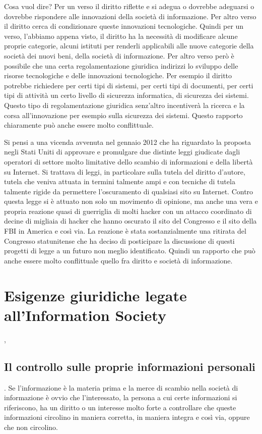Cosa vuol dire? Per un verso il diritto riflette e si adegua o dovrebbe adeguarsi o dovrebbe rispondere alle innovazioni della società di informazione. Per altro verso il diritto cerca di condizionare queste innovazioni tecnologiche. Quindi per un verso, l'abbiamo appena visto, il diritto ha la necessità di modificare alcune proprie categorie, alcuni istituti per renderli applicabili alle nuove categorie della società dei nuovi beni, della società di informazione. 
Per altro verso però è possibile che una certa regolamentazione giuridica indirizzi lo sviluppo delle risorse tecnologiche e delle innovazioni tecnologiche. 
Per esempio il diritto potrebbe richiedere per certi tipi di sistemi, per certi tipi di documenti, per certi tipi di attività un certo livello di sicurezza informatica, di sicurezza dei sistemi. Questo tipo di regolamentazione giuridica senz'altro incentiverà la ricerca e la corsa all'innovazione per esempio sulla sicurezza dei sistemi. Questo rapporto chiaramente può anche essere molto conflittuale. 

Si pensi a una vicenda avvenuta nel gennaio 2012 che ha riguardato la proposta negli Stati Uniti di approvare e promulgare due distinte leggi giudicate dagli operatori di settore molto limitative dello scambio di informazioni e della libertà su Internet. Si trattava di leggi, in particolare sulla tutela del diritto d'autore, tutela che veniva attuata in termini talmente ampi e con tecniche di tutela talmente rigide da permettere l'oscuramento di qualsiasi sito su Internet. Contro questa legge si è attuato non solo un movimento di opinione, ma anche una vera e propria reazione quasi di guerriglia di molti hacker con un attacco coordinato di decine di migliaia di hacker che hanno oscurato il sito del Congresso e il sito della FBI in America e così via. 
La reazione è stata sostanzialmente una ritirata del Congresso statunitense che ha deciso di posticipare la discussione di questi progetti di legge a un futuro non meglio identificato. Quindi un rapporto che può anche essere molto conflittuale quello fra diritto e società di informazione.\par


\section{Esigenze giuridiche legate all'Information Society}, 

\subsection{Il controllo sulle proprie informazioni personali}.
Se l'informazione è la materia prima e la merce di scambio nella società di informazione è ovvio che l'interessato, la persona a cui certe informazioni si riferiscono, ha un diritto o un interesse molto forte a controllare che queste informazioni circolino in maniera corretta, in maniera integra e così via, oppure che non circolino.

